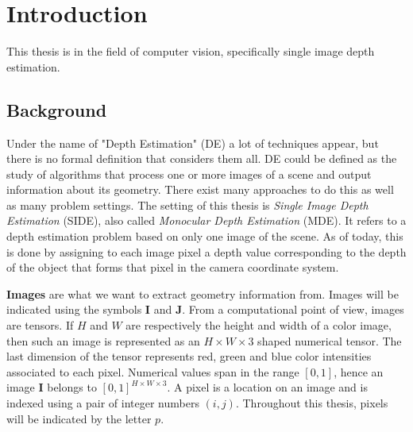 \chapter{Introduction}
\label{ch:intro}

This thesis is in the field of computer vision, specifically single image depth estimation.

\section{Background}
Under the name of "Depth Estimation" (DE) a lot of techniques appear, but there is no formal definition that considers them all.
DE could be defined as the study of algorithms that process one or more images of a scene and output information about its geometry.
There exist many approaches to do this as well as many problem settings.
The setting of this thesis is \textit{Single Image Depth Estimation} (SIDE), also called \textit{Monocular Depth Estimation} (MDE).
It refers to a depth estimation problem based on only one image of the scene.
As of today, this is done by assigning to each image pixel a depth value corresponding to the depth of the object that forms that pixel in the camera coordinate system.

\vspace{0.2cm}

\textbf{Images} are what we want to extract geometry information from.
Images will be indicated using the symbols $\mathbf{I}$ and $\mathbf{J}$.
From a computational point of view, images are tensors.
If $H$ and $W$ are respectively the height and width of a color image, then such an image is represented as an $H \times W \times 3$ shaped numerical tensor.
The last dimension of the tensor represents red, green and blue color intensities associated to each pixel.
Numerical values span in the range $[0, 1]$, hence an image $\mathbf{I}$ belongs to $[0, 1]^{H \times W \times 3}$.
A pixel is a location on an image and is indexed using a pair of integer numbers $(i, j)$.
Throughout this thesis, pixels will be indicated by the letter $p$.

\vspace{0.2cm}

